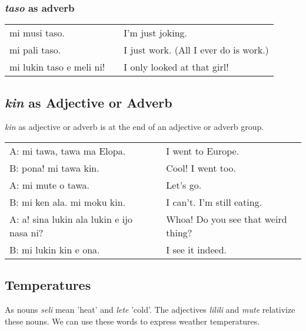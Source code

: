 {\subsubsection*{\textit{taso} as adverb}
%
\begin{supertabular}{p{5,5cm}|ll}
mi musi taso. && I'm just joking. \\
mi pali taso. && I just work. (All I ever do is work.) \\ 
mi lukin taso e meli ni! && I only looked at that girl!  \\
\end{supertabular} 
%
\subsection*{\textit{kin} as Adjective or Adverb}
%
%
\textit{kin} as adjective or adverb is at the end of an adjective or adverb group.

\begin{supertabular}{p{5,5cm}|ll}
A: mi tawa, tawa ma Elopa. && I went to Europe. \\
B: pona! mi tawa kin. && Cool! I went too. \\
A: mi mute o tawa. && Let's go. \\
B: mi ken ala. mi moku kin. && I can't. I'm still eating. \\
A: a! sina lukin ala lukin e ijo nasa ni? && Whoa! Do you see that weird thing? \\
B: mi lukin kin e ona. && I see it indeed. \\
\end{supertabular} 

%
%
%
%
\subsection*{Temperatures}
%
%
As nouns \textit{seli} mean 'heat' and \textit{lete} 'cold'. 
The adjectives \textit{lilili} and \textit{mute} relativize these nouns. 
We can use these words to express weather temperatures. 

}

